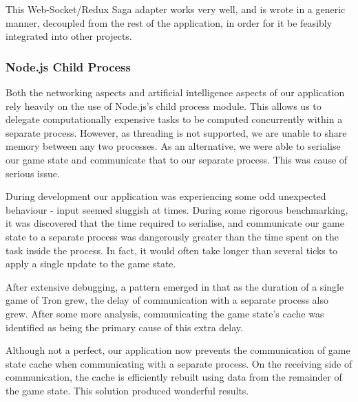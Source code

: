 \documentclass{standalone}
\begin{document}
				This Web-Socket/Redux Saga adapter works very well, and is wrote in a generic manner, decoupled from the rest of the application, in order for it be feasibly integrated into other projects.

			\subsubsection{Node.js Child Process}
				Both the networking aspects and artificial intelligence aspects of our application rely heavily on the use of Node.js's child process module. This allows us to delegate computationally expensive tasks to be computed concurrently within a separate process. However, as threading is not supported, we are unable to share memory between any two processes. As an alternative, we were able to serialise our game state and communicate that to our separate process. This was cause of serious issue. 

				During development our application was experiencing some odd unexpected behaviour - input seemed sluggish at times. During some rigorous benchmarking, it was discovered that the time required to serialise, and communicate our game state to a separate process was dangerously greater than the time spent on the task inside the process. In fact, it would often take longer than several ticks to apply a single update to the game state.

				After extensive debugging, a pattern emerged in that as the duration of a single game of Tron grew, the delay of communication with a separate process also grew. After some more analysis, communicating the game state's cache was identified as being the primary cause of this extra delay.

				Although not a perfect, our application now prevents the communication of game state cache when communicating with a separate process. On the receiving side of communication, the cache is efficiently rebuilt using data from the remainder of the game state. This solution produced wonderful results.
\end{document}
